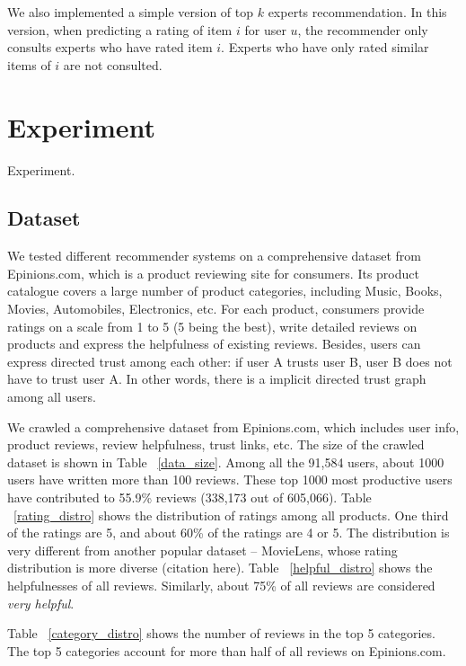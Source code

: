 \documentclass[12pt]{article}
\begin{document}
We also implemented a simple version of top $k$ experts recommendation. In this version, when predicting a rating of item $i$ for user $u$, the recommender only consults experts who have rated item $i$. Experts who have only rated similar items of $i$ are not consulted.
 



\section{Experiment}
Experiment.
\subsection{Dataset}
We tested different recommender systems on a comprehensive dataset from Epinions.com, which is a product reviewing site for consumers. Its product catalogue covers a large number of product categories, including Music, Books, Movies, Automobiles, Electronics, etc. For each product, consumers provide ratings on a scale from 1 to 5 (5 being the best), write detailed reviews on products and express the helpfulness of existing reviews. Besides, users can express directed trust among each other: if user A trusts user B, user B does not have to trust user A. In other words, there is a implicit directed trust graph among all users. 

We crawled a comprehensive dataset from Epinions.com, which includes user info, product reviews, review helpfulness, trust links, etc. The size of the crawled dataset is shown in Table ~\ref{data_size}. Among all the 91,584 users, about 1000 users have written more than 100 reviews. These top 1000 most productive users have contributed to 55.9\% reviews (338,173 out of 605,066).  Table ~\ref{rating_distro} shows the distribution of ratings among all products. One third of the ratings are 5, and about 60\% of the ratings are 4 or 5. The distribution is very different from another popular dataset -- MovieLens, whose rating distribution is more diverse (citation here). Table ~\ref{helpful_distro} shows the helpfulnesses of all reviews. Similarly, about 75\% of all reviews are considered \emph{very helpful}. 

Table ~\ref{category_distro} shows the number of reviews in the top 5 categories. The top 5 categories account for more than half of all reviews on Epinions.com.
\end{document}
